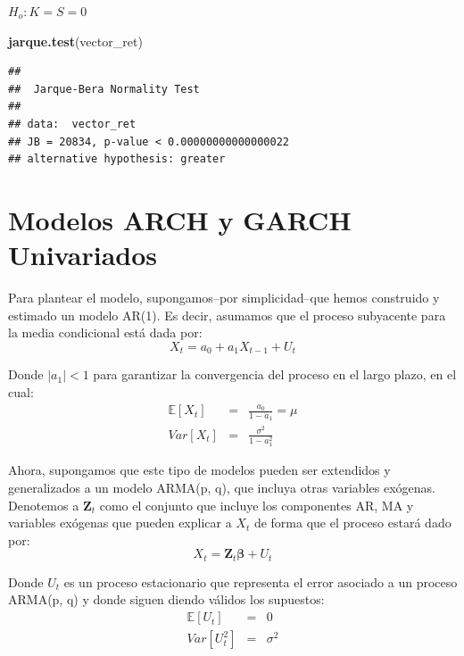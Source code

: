 \documentclass[
]{book}
\newenvironment{Shaded}{\begin{snugshade}}{\end{snugshade}}
\newcommand{\FunctionTok}[1]{\textcolor[rgb]{0.13,0.29,0.53}{\textbf{#1}}}
\newcommand{\NormalTok}[1]{#1}
\begin{document}
\(H_o: K=S=0\)

\begin{Shaded}
\begin{Highlighting}[]
\FunctionTok{jarque.test}\NormalTok{(vector\_ret)}
\end{Highlighting}
\end{Shaded}

\begin{verbatim}
## 
##  Jarque-Bera Normality Test
## 
## data:  vector_ret
## JB = 20834, p-value < 0.00000000000000022
## alternative hypothesis: greater
\end{verbatim}

\hypertarget{modelos-arch-y-garch-univariados}{%
\section{Modelos ARCH y GARCH Univariados}\label{modelos-arch-y-garch-univariados}}

Para plantear el modelo, supongamos--por simplicidad--que hemos construido y estimado un modelo AR(1). Es decir, asumamos que el proceso subyacente para la media condicional está dada por:
\begin{equation}
    X_t = a_0 + a_1 X_{t-1} + U_t
\end{equation}

Donde \(| a_1 |< 1\) para garantizar la convergencia del proceso en el largo plazo, en el cual:
\begin{eqnarray*}
    \mathbb{E}[X_t] & = & \frac{a_0 }{1 - a_1} = \mu \\
    Var[X_t] & = & \frac{\sigma^2}{1 - a_1^2}
\end{eqnarray*}

Ahora, supongamos que este tipo de modelos pueden ser extendidos y generalizados a un modelo ARMA(p, q), que incluya otras variables exógenas. Denotemos a \(\mathbf{Z}_t\) como el conjunto que incluye los componentes AR, MA y variables exógenas que pueden explicar a \(X_t\) de forma que el proceso estará dado por:
\begin{equation}
    X_t = \mathbf{Z}_t \boldsymbol{\beta} + U_t
\end{equation}

Donde \(U_t\) es un proceso estacionario que representa el error asociado a un proceso ARMA(p, q) y donde siguen diendo válidos los supuestos:
\begin{eqnarray*}
    \mathbb{E}[U_t] & = & 0 \\
    Var[U_t^2] & = & \sigma^2
\end{eqnarray*}
\end{document}
